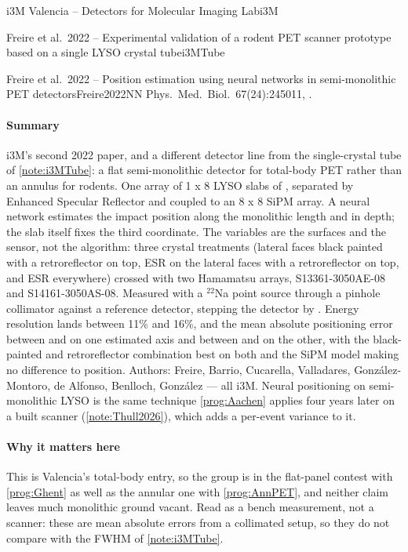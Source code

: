\begin{programnote}{i3M Valencia -- Detectors for Molecular Imaging Lab}{i3M}
\begin{papernote}{Freire et al.\ 2022 -- Experimental validation of a rodent PET scanner prototype based on a single LYSO crystal tube}{i3MTube}
\end{papernote}

\begin{papernote}{Freire et al.\ 2022 -- Position estimation using neural networks in semi-monolithic PET detectors}{Freire2022NN}
Phys.\ Med.\ Biol.\ 67(24):245011, .

\paragraph{Summary}
i3M's second 2022 paper, and a different detector line from the single-crystal
tube of \ref{note:i3MTube}: a flat semi-monolithic detector for total-body PET
rather than an annulus for rodents. One array of 1 x 8 LYSO slabs of
, separated by Enhanced Specular
Reflector and coupled to an 8 x 8 SiPM array. A neural network estimates the
impact position along the monolithic length and in depth; the slab itself
fixes the third coordinate. The variables are the surfaces and the sensor,
not the algorithm: three crystal treatments (lateral faces black painted with
a retroreflector on top, ESR on the lateral faces with a retroreflector on
top, and ESR everywhere) crossed with two Hamamatsu arrays, S13361-3050AE-08
and S14161-3050AS-08. Measured with a $^{22}$Na point source through a
pinhole collimator against a reference detector, stepping the detector by
. Energy resolution lands between 11\% and 16\%, and the mean absolute
positioning error between  and  on one
estimated axis and between  and  on the
other, with the black-painted and retroreflector combination best on both and
the SiPM model making no difference to position. Authors: Freire, Barrio,
Cucarella, Valladares, González-Montoro, de Alfonso, Benlloch, González ---
all i3M. Neural positioning on semi-monolithic LYSO is the same technique
\ref{prog:Aachen} applies four years later on a built scanner
(\ref{note:Thull2026}), which adds a per-event variance to it.

\paragraph{Why it matters here}
This is Valencia's total-body entry, so the group is in the flat-panel
contest with \ref{prog:Ghent} as well as the annular one with
\ref{prog:AnnPET}, and neither claim leaves much monolithic ground vacant.
Read as a bench measurement, not a scanner: these are mean absolute errors
from a collimated setup, so they do not compare with the  FWHM of
\ref{note:i3MTube}.


\end{papernote}
\end{programnote}
